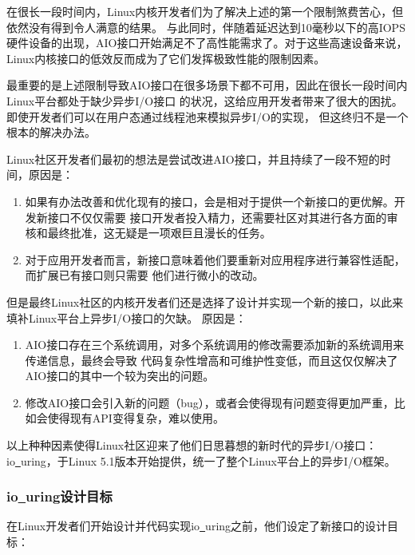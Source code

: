 \documentclass[supercite]{HustGraduPaper}
\theoremstyle{definition}
\begin{document}
在很长一段时间内，Linux内核开发者们为了解决上述的第一个限制煞费苦心，但依然没有得到令人满意的结果。
与此同时，伴随着延迟达到10毫秒以下的高IOPS硬件设备的出现，AIO接口开始满足不了高性能需求了。对于这些高速设备来说，
Linux内核接口的低效反而成为了它们发挥极致性能的限制因素。\par

最重要的是上述限制导致AIO接口在很多场景下都不可用，因此在很长一段时间内Linux平台都处于缺少异步I/O接口
的状况，这给应用开发者带来了很大的困扰。即使开发者们可以在用户态通过线程池来模拟异步I/O的实现，
但这终归不是一个根本的解决办法。\par

Linux社区开发者们最初的想法是尝试改进AIO接口，并且持续了一段不短的时间，原因是：

\begin{enumerate}[label={(\arabic*)}]
  \item 如果有办法改善和优化现有的接口，会是相对于提供一个新接口的更优解。开发新接口不仅仅需要
    接口开发者投入精力，还需要社区对其进行各方面的审核和最终批准，这无疑是一项艰巨且漫长的任务。
  \item 对于应用开发者而言，新接口意味着他们要重新对应用程序进行兼容性适配，而扩展已有接口则只需要
    他们进行微小的改动。
\end{enumerate}

但是最终Linux社区的内核开发者们还是选择了设计并实现一个新的接口，以此来填补Linux平台上异步I/O接口的欠缺。
原因是：

\begin{enumerate}[label={(\arabic*)}]
  \item AIO接口存在三个系统调用，对多个系统调用的修改需要添加新的系统调用来传递信息，最终会导致
    代码复杂性增高和可维护性变低，而且这仅仅解决了AIO接口的其中一个较为突出的问题。
  \item 修改AIO接口会引入新的问题（bug），或者会使得现有问题变得更加严重，比如会使得现有API变得复杂，难以使用。
\end{enumerate}

以上种种因素使得Linux社区迎来了他们日思暮想的新时代的异步I/O接口：
io\underline{~}uring，于Linux 5.1版本开始提供，统一了整个Linux平台上的异步I/O框架。\par

\subsubsection{io\underline{~}uring设计目标}
在Linux开发者们开始设计并代码实现io\underline{~}uring之前，他们设定了新接口的设计目标：
\end{document}

